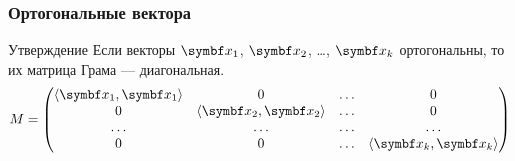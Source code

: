 \begin{frame}
    \frametitle{Ортогональные вектора}

    \begin{block}{Утверждение}
        Если векторы $\bx_1$, $\bx_2$, \ldots, $\bx_k$ ортогональны, то их матрица Грама —
        диагональная.
        \[
            M  = \begin{pmatrix}
                \langle \bx_1, \bx_1 \rangle & 0 & \ldots & 0 \\
                0 & \langle \bx_2, \bx_2 \rangle &  \ldots & 0 \\
                \ldots & \ldots & \ldots & \ldots \\
                0 & 0 & \ldots & \langle \bx_k, \bx_k \rangle \\
            \end{pmatrix}
        \]      

    \end{block}
    

\end{frame}
